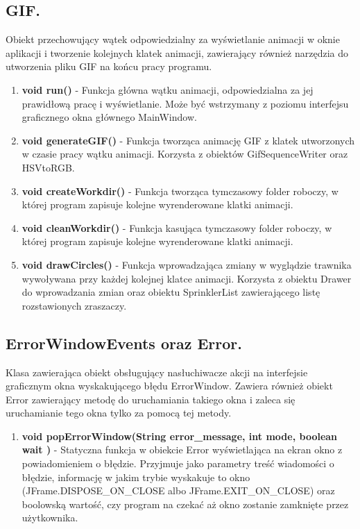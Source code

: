 \documentclass[a4paper]{article}
\begin{document}
\subsection{GIF.}
Obiekt przechowujący wątek odpowiedzialny za wyświetlanie animacji w oknie aplikacji i tworzenie kolejnych klatek animacji, zawierający również narzędzia do utworzenia pliku GIF na końcu pracy programu.
\begin{enumerate}
    	\item \textbf{void run()} - Funkcja główna wątku animacji, odpowiedzialna za jej prawidłową pracę i wyświetlanie. Może być wstrzymany z poziomu interfejsu graficznego okna głównego MainWindow.
    	\item \textbf{void generateGIF()} - Funkcja tworząca animację GIF z klatek utworzonych w czasie pracy wątku animacji. Korzysta z obiektów GifSequenceWriter oraz HSVtoRGB.
    	\item \textbf{void createWorkdir()} - Funkcja tworząca tymczasowy folder roboczy, w której program zapisuje kolejne wyrenderowane klatki animacji.
    	\item \textbf{void cleanWorkdir()} - Funkcja kasująca tymczasowy folder roboczy, w której program zapisuje kolejne wyrenderowane klatki animacji.
    	\item \textbf{void drawCircles()} - Funkcja wprowadzająca zmiany w wyglądzie trawnika wywoływana przy każdej kolejnej klatce animacji. Korzysta z obiektu Drawer do wprowadzania zmian oraz obiektu SprinklerList zawierającego listę rozstawionych zraszaczy.
\end{enumerate}

\subsection{ErrorWindowEvents oraz Error.}
Klasa zawierająca obiekt obsługujący nasłuchiwacze akcji na interfejsie graficznym okna wyskakującego błędu ErrorWindow. Zawiera również obiekt Error zawierający metodę do uruchamiania takiego okna i zaleca się uruchamianie tego okna tylko za pomocą tej metody.
\begin{enumerate}
    	\item \textbf{void popErrorWindow(String error\_message, int mode, boolean wait )} - Statyczna funkcja w obiekcie Error wyświetlająca na ekran okno z powiadomieniem o błędzie. Przyjmuje jako parametry treść wiadomości o błędzie, informację w jakim trybie wyskakuje to okno (JFrame.DISPOSE\_ON\_CLOSE albo JFrame.EXIT\_ON\_CLOSE) oraz boolowską wartość, czy program na czekać aż okno zostanie zamknięte przez użytkownika.
\end{enumerate}
\end{document}
